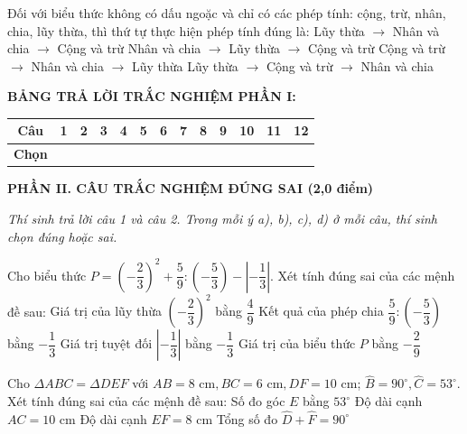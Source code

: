 \documentclass[12pt,a4paper]{article}
\begin{document}
\begin{ex}
Đối với biểu thức không có dấu ngoặc và chỉ có các phép tính: cộng, trừ, nhân, chia, lũy thừa, thì thứ tự thực hiện phép tính đúng là:
\choice
{\True Lũy thừa $\to$ Nhân và chia $\to$ Cộng và trừ}
{Nhân và chia $\to$ Lũy thừa $\to$ Cộng và trừ}
{Cộng và trừ $\to$ Nhân và chia $\to$ Lũy thừa}
{Lũy thừa $\to$ Cộng và trừ $\to$ Nhân và chia}
\end{ex}


\vspace{1mm}
\noindent\textbf{BẢNG TRẢ LỜI TRẮC NGHIỆM PHẦN I:}
\begin{center}
\begin{tabular}{|c|c|c|c|c|c|c|c|c|c|c|c|c|}
\hline
\textbf{Câu} & \textbf{1} & \textbf{2} & \textbf{3} & \textbf{4} & \textbf{5} & \textbf{6} & \textbf{7} & \textbf{8} & \textbf{9} & \textbf{10} & \textbf{11} & \textbf{12} \\
\hline
\textbf{Chọn} & \rule{0pt}{0.55cm} & & & & & & & & & & & \\
\hline
\end{tabular}
\end{center}
\vspace{1mm}

\setcounter{ex}{0}
\noindent\textbf{\large PHẦN II. CÂU TRẮC NGHIỆM ĐÚNG SAI (2,0 điểm)}

\textit{Thí sinh trả lời câu 1 và câu 2. Trong mỗi ý a), b), c), d) ở mỗi câu, thí sinh chọn đúng hoặc sai.}

\vspace{1mm}
\begin{ex}
Cho biểu thức $P = \left(-\dfrac{2}{3}\right)^2 + \dfrac{5}{9} : \left(-\dfrac{5}{3}\right) - \left|-\dfrac{1}{3}\right|$. Xét tính đúng sai của các mệnh đề sau:
\choiceTF
{\True Giá trị của lũy thừa $\left(-\dfrac{2}{3}\right)^2$ bằng $\dfrac{4}{9}$}
{\True Kết quả của phép chia $\dfrac{5}{9} : \left(-\dfrac{5}{3}\right)$ bằng $-\dfrac{1}{3}$}
{Giá trị tuyệt đối $\left|-\dfrac{1}{3}\right|$ bằng $-\dfrac{1}{3}$}
{\True Giá trị của biểu thức $P$ bằng $-\dfrac{2}{9}$}
\end{ex}

\begin{ex}
Cho $\Delta ABC = \Delta DEF$ với $AB = 8\text{ cm}, BC = 6\text{ cm}, DF = 10\text{ cm}$; $\widehat{B} = 90^\circ, \widehat{C} = 53^\circ$. Xét tính đúng sai của các mệnh đề sau:
\choiceTF
{Số đo góc $E$ bằng $53^\circ$}
{\True Độ dài cạnh $AC = 10\text{ cm}$}
{Độ dài cạnh $EF = 8\text{ cm}$}
{\True Tổng số đo $\widehat{D} + \widehat{F} = 90^\circ$}
\end{ex}
\end{document}

